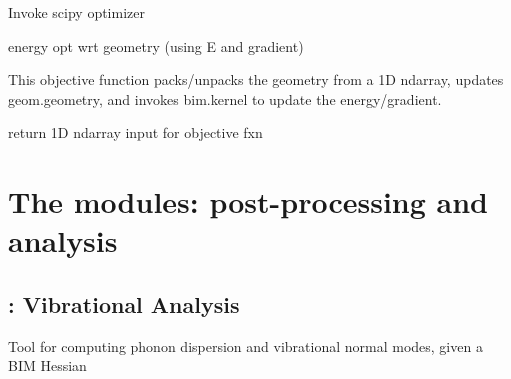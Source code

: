 \documentclass[letterpaper,10pt,english]{sphinxmanual}
\begin{document}

\begin{fulllineitems}
\label{\detokenize{drivers:drivers.bim_opt.kernel}}
Invoke scipy optimizer

\end{fulllineitems}


\begin{fulllineitems}
\label{\detokenize{drivers:drivers.bim_opt.objective_gopt}}
energy opt wrt geometry (using E and gradient)

This objective function packs/unpacks the geometry from
a 1D ndarray, updates geom.geometry, and invokes bim.kernel
to update the energy/gradient.

\end{fulllineitems}


\begin{fulllineitems}
\label{\detokenize{drivers:drivers.bim_opt.to_flat}}
return 1D ndarray input for objective fxn

\end{fulllineitems}



\section{The  modules: post-processing and analysis}
\label{\detokenize{tools:the-tools-modules-post-processing-and-analysis}}\label{\detokenize{tools::doc}}

\subsection{: Vibrational Analysis}
\label{\detokenize{tools:phonon-vibrational-analysis}}\label{\detokenize{tools:module-tools.phonon}}
Tool for computing phonon dispersion and vibrational normal modes, given a
BIM Hessian
\end{document}
